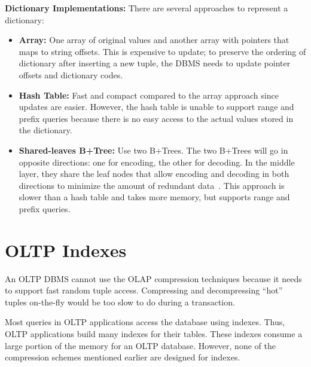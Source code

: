 \documentclass[11pt]{article}
\begin{document}
\textbf{Dictionary Implementations:} There are several approaches to represent a dictionary:
\begin{itemize}
    \item \textbf{Array:} One array of original values and another array with pointers that maps to string offsets. This is expensive to update; to preserve the ordering of dictionary after inserting a new tuple, the DBMS needs to update pointer offsets and dictionary codes.
    \item \textbf{Hash Table:} Fast and compact compared to the array approach since updates are easier. However, the hash table is unable to support range and prefix queries because there is no easy access to the actual values stored in the dictionary.
    \item \textbf{Shared-leaves B+Tree:} Use two B+Trees. The two B+Trees will go in opposite directions: one for encoding, the other for decoding. In the middle layer, they share the leaf nodes that allow encoding and decoding in both directions to minimize the amount of redundant data~\cite{p283-binnig}. This approach is slower than a hash table and takes more memory, but supports range and prefix queries.
\end{itemize}

\section{OLTP Indexes}
An OLTP DBMS cannot use the OLAP compression techniques because it needs to support fast random tuple access. Compressing and decompressing “hot” tuples on-the-fly
would be too slow to do during a transaction. 

Most queries in OLTP applications access the database using indexes. Thus, OLTP applications build many indexes for their tables. These indexes consume a large portion of the memory for an OLTP database. However, none of the compression schemes mentioned earlier are designed for indexes.
\end{document}
